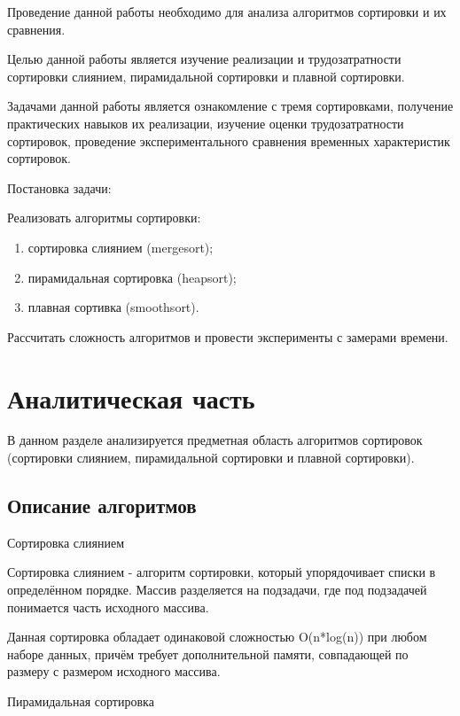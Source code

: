 \documentclass[12pt,a4paper]{scrartcl}
\begin{document}
Проведение данной работы необходимо для анализа алгоритмов сортировки и их сравнения.

Целью данной работы является изучение реализации и трудозатратности сортировки слиянием, пирамидальной сортировки и плавной сортировки.

Задачами данной работы является ознакомление с тремя сортировками, получение практических навыков их реализации, изучение оценки трудозатратности сортировок, проведение экспериментального сравнения временных характеристик сортировок.

Постановка задачи:

Реализовать алгоритмы сортировки:
\begin{enumerate}
	\item сортировка слиянием (mergesort);
	\item пирамидальная сортировка (heapsort);
	\item плавная сортивка (smoothsort).
\end{enumerate}

Рассчитать сложность алгоритмов и провести эксперименты с замерами времени.

\newpage
\section{Аналитическая часть}

В данном разделе анализируется предметная область алгоритмов сортировок (сортировки слиянием, пирамидальной сортировки и плавной сортировки).

\subsection{Описание алгоритмов} 
\begin{center}
Сортировка слиянием
\end{center}

Сортировка слиянием - алгоритм сортировки, который упорядочивает списки в определённом порядке. Массив разделяется на подзадачи, где под подзадачей понимается часть исходного массива. \cite{Beg}

Данная сортировка обладает одинаковой сложностью O(n*log(n)) при любом наборе данных, причём требует дополнительной памяти, совпадающей по размеру с размером исходного массива. \cite{Beg}

\begin{center}
Пирамидальная сортировка
\end{center}
\end{document}
